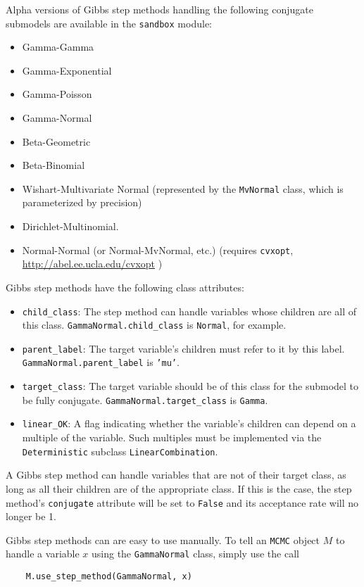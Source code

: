 Alpha versions of Gibbs step methods handling the following conjugate submodels are available in the \texttt{sandbox} module:
\begin{itemize}
    \item Gamma-Gamma
    \item Gamma-Exponential
    \item Gamma-Poisson
    \item Gamma-Normal
    \item Beta-Geometric
    \item Beta-Binomial
    \item Wishart-Multivariate Normal (represented by the \texttt{MvNormal} class, which is parameterized by precision)
    \item Dirichlet-Multinomial.
    \item Normal-Normal (or Normal-MvNormal, etc.) (requires \texttt{cvxopt}, \href{http://abel.ee.ucla.edu/cvxopt}{http://abel.ee.ucla.edu/cvxopt} )
\end{itemize}

Gibbs step methods have the following class attributes:
\begin{itemize}
    \item \texttt{child_class}: The step method can handle variables whose children are all of this class. \texttt{GammaNormal.child_class} is \texttt{Normal}, for example.
    \item \texttt{parent_label}: The target variable's children must refer to it by this label. \texttt{GammaNormal.parent_label} is \texttt{'mu'}.
    \item \texttt{target_class}: The target variable should be of this class for the submodel to be fully conjugate. \texttt{GammaNormal.target_class} is \texttt{Gamma}.
    \item \texttt{linear_OK}: A flag indicating whether the variable's children can depend on a multiple of the variable. Such multiples must be implemented via the \texttt{Deterministic} subclass \texttt{LinearCombination}.
\end{itemize}

A Gibbs step method can handle variables that are not of their target class, as long as all their children are of the appropriate class. If this is the case, the step method's \texttt{conjugate} attribute will be set to \texttt{False} and its acceptance rate will no longer be 1.

Gibbs step methods can are easy to use manually. To tell an \texttt{MCMC} object $M$ to handle a variable $x$ using the \texttt{GammaNormal} class, simply use the call
\begin{verbatim}
    M.use_step_method(GammaNormal, x)
\end{verbatim}

